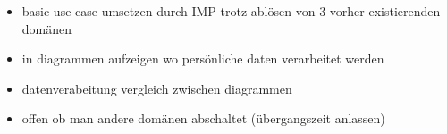 \begin{itemize}
    \item basic use case umsetzen durch IMP trotz ablösen von 3 vorher existierenden domänen
    
    \item in diagrammen aufzeigen wo persönliche daten verarbeitet werden
    
    \item datenverabeitung vergleich zwischen diagrammen
    
    \item offen ob man andere domänen abschaltet (übergangszeit anlassen)
    
\end{itemize}